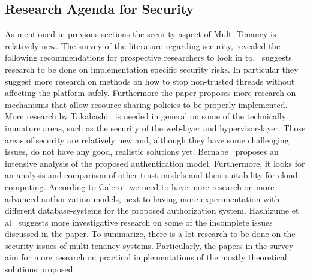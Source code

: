 \subsection{Research Agenda for Security}
As mentioned in previous sections the security aspect of Multi-Tenancy is relatively new.
The survey of the literature regarding security, revealed the following recommendations for prospective researchers to look in to.~\cite{Merino2011Security} suggests research to be done on implementation specific security risks.
In particular they suggest more research on methods on how to stop non-trusted threads without affecting the platform safely.
Furthermore the paper proposes more research on mechanisms that allow resource sharing policies to be properly implemented.
More research by Takahashi~\cite{Takahashi2012Security} is needed in general on some of the technically immature areas, such as the security of the web-layer and hypervisor-layer.
Those areas of security are relatively new and, although they have some challenging issues, do not have any good, realistic solutions yet.
Bernabe~\cite{Bernabe2012Auth} proposes an intensive analysis of the proposed authentication model.
Furthermore, it looks for an analysis and comparison of other trust models and their suitability for cloud computing.
According to Calero~\cite{Calero2010Auth} we need to have more research on more advanced authorization models, next to having more experimentation with different database-systems for the proposed authorization system.
Hashizume et al~\cite{Hashizume2013Security} suggests more investigative research on some of the incomplete issues discussed in the paper.
To summarize, there is a lot research to be done on the security issues of multi-tenancy systems.
Particularly, the papers in the survey aim for more research on practical implementations of the mostly theoretical solutions proposed.
